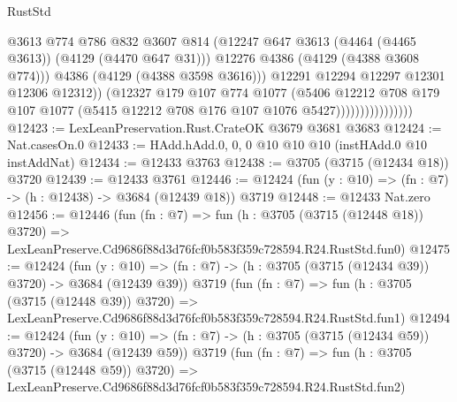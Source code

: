 \begin{lexlean}{RustStd}
\begin{coremodule}
                                      @3613
                                      @774
                                      @786
                                      @832
                                      @3607
                                      @814
                                      (@12247
                                        @647
                                        @3613
                                        (@4464 (@4465 @3613))
                                        (@4129 (@4470 @647 @31)))
                                      @12276
                                      @4386
                                      (@4129 (@4388 @3608 @774)))
                                    @4386
                                    (@4129 (@4388 @3598 @3616)))
                                  @12291
                                  @12294
                                  @12297
                                  @12301
                                  @12306
                                  @12312))
                              (@12327
                                @179
                                @107
                                @774
                                @1077
                                (@5406
                                  @12212
                                  @708
                                  @179
                                  @107
                                  @1077
                                  (@5415 @12212 @708 @176 @107 @1076 @5427))))))))))))))))
@12423 := LexLeanPreservation.Rust.CrateOK @3679 @3681 @3683
@12424 := Nat.casesOn.{0}
@12433 := HAdd.hAdd.{0, 0, 0} @10 @10 @10 (instHAdd.{0} @10 instAddNat)
@12434 := @12433 @3763
@12438 := @3705 (@3715 (@12434 @18)) @3720
@12439 := @12433 @3761
@12446 := @12424 (fun (y : @10) => (fn : @7) -> (h : @12438) -> @3684 (@12439 @18)) @3719
@12448 := @12433 Nat.zero
@12456 := @12446
    (fun (fn : @7) =>
    fun (h : @3705 (@3715 (@12448 @18)) @3720) =>
    LexLeanPreserve.Cd9686f88d3d76fcf0b583f359c728594.R24.RustStd.fun0)
@12475 := @12424
    (fun (y : @10) => (fn : @7) -> (h : @3705 (@3715 (@12434 @39)) @3720) -> @3684 (@12439 @39))
    @3719
    (fun (fn : @7) =>
    fun (h : @3705 (@3715 (@12448 @39)) @3720) =>
    LexLeanPreserve.Cd9686f88d3d76fcf0b583f359c728594.R24.RustStd.fun1)
@12494 := @12424
    (fun (y : @10) => (fn : @7) -> (h : @3705 (@3715 (@12434 @59)) @3720) -> @3684 (@12439 @59))
    @3719
    (fun (fn : @7) =>
    fun (h : @3705 (@3715 (@12448 @59)) @3720) =>
    LexLeanPreserve.Cd9686f88d3d76fcf0b583f359c728594.R24.RustStd.fun2)

\end{coremodule}
\end{lexlean}
